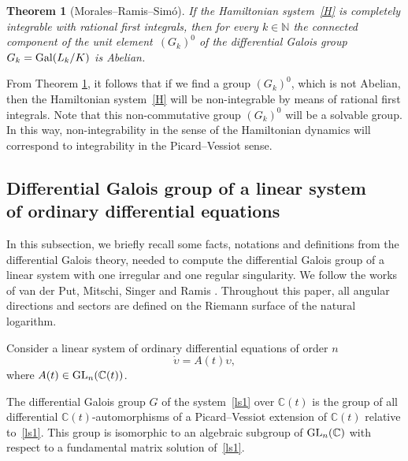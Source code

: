 \documentclass[pdftex]{sigma}
\numberwithin{equation}{section}
\newtheorem{Theorem}{Theorem}[section]
\begin{document}
 \begin{Theorem}[Morales--Ramis--Sim\'{o}]\label{MRS}
 If the Hamiltonian system~\eqref{H} is completely integrable with rational first integrals, then for every $k\in\mathbb{N}$
 the connected component of the unit element~$(G_k)^0$ of the differential Galois group $G_k={\rm Gal}(L_k/K)$
 is Abelian.
 \end{Theorem}

 From Theorem \ref{MRS}, it follows that if we find a group $(G_k)^0$, which is not Abelian, then the Hamiltonian system~\eqref{H} will be non-integrable
 by means of rational first integrals.
 Note that this non-commutative group $(G_k)^0$ will be a solvable group. In this way,
 non-integrability in the sense of the Hamiltonian dynamics will correspond to integrability in the Picard--Vessiot sense.

 \subsection[Differential Galois group of a linear system of ordinary differential equations]{Differential Galois group of a linear system \\ of ordinary differential equations}

 In this subsection, we briefly recall some facts, notations and definitions from the differential Galois theory, needed
 to compute the differential Galois group of a linear system with one irregular and one regular singularity. We follow
 the works of van der Put, Mitschi, Singer and Ramis \cite{Mi,R3, Si, vPS}. Throughout this paper, all angular directions
 and sectors are defined on the Riemann surface of the natural logarithm.

 Consider a linear system of ordinary differential equations of order $n$
 \begin{equation}
 \dot{\upsilon}=A(t) \upsilon ,\label{ls1}
 \end{equation}
 where $A(t)\in {\rm GL}_n(\mathbb{C}(t))$.

 \begin{Definition}\label{Gal}
The differential Galois group $G$ of the system~\eqref{ls1} over $\mathbb{C}(t)$ is the group of all differential $\mathbb{C}(t)$-automorphisms of
 a Picard--Vessiot extension of $\mathbb{C}(t)$ relative to~\eqref{ls1}. This group is isomorphic to an algebraic subgroup of ${\rm GL}_n(\mathbb{C})$
 with respect to a fundamental matrix solution of~\eqref{ls1}.
 \end{Definition}
\end{document}
